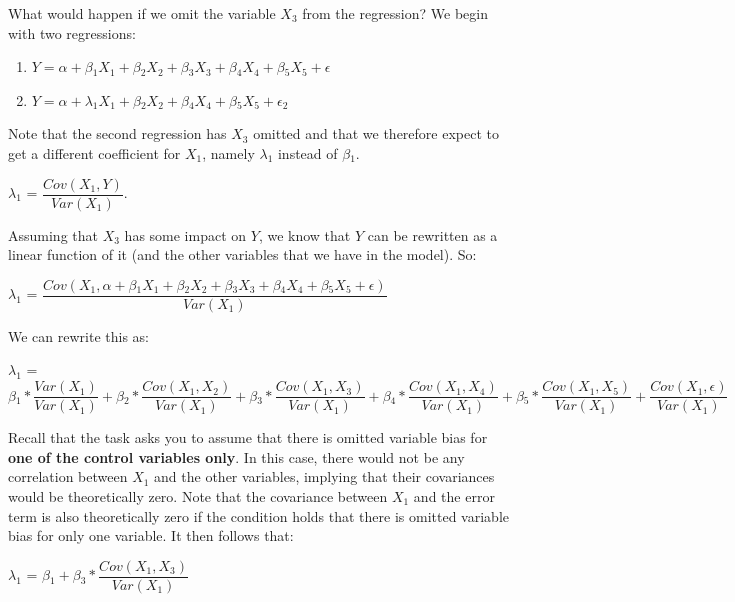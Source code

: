 \documentclass[12pt]{article}\usepackage[]{graphicx}\usepackage[]{color}
\begin{document}
What would happen if we omit the variable $X_3$ from the regression? We begin with two regressions:

\begin{enumerate}
  \item $ Y = \alpha + \beta{_1}X_1 + \beta{_2}X_2 + \beta{_3}X_3 + \beta{_4}X_4 + \beta{_5}X_5 + \epsilon$
  \item $ Y = \alpha + \lambda{_1}X_1 + \beta{_2}X_2 + \beta{_4}X_4 + \beta{_5}X_5 + \epsilon{_2}$
\end{enumerate}

\bigskip

Note that the second regression has $X_3$ omitted and that we therefore expect to get a different coefficient for $X_1$, namely  $\lambda{_1}$ instead of $\beta{_1}$.

\bigskip

$\lambda{_1}$ = $\dfrac{Cov(X_1,Y)}{Var(X_1)}$.

\bigskip

Assuming that $X_3$ has some impact on $Y$, we know that $Y$ can be rewritten as a linear function of it (and the other variables that we have in the model). So:

\bigskip

$\lambda{_1}$ = $\dfrac{Cov(X_1,\alpha + \beta{_1}X_1 + \beta{_2}X_2 + \beta{_3}X_3 + \beta{_4}X_4 + \beta{_5}X_5 + \epsilon)}{Var(X_1)}$

\bigskip

We can rewrite this as:

\bigskip

$\lambda{_1}$ = $\beta{_1}*\dfrac{Var(X_1)}{Var(X_1)} + \beta{_2}*\dfrac{Cov(X_1,X_2)}{Var(X_1)} + \beta{_3}*\dfrac{Cov(X_1,X_3)}{Var(X_1)} + \beta{_4}*\dfrac{Cov(X_1,X_4)}{Var(X_1)}  + \beta{_5}*\dfrac{Cov(X_1,X_5)}{Var(X_1)} + \dfrac{Cov(X_1,\epsilon)}{Var(X_1)}$

\bigskip

Recall that the task asks you to assume that there is omitted variable bias for \textbf{one of the control variables only}. In this case, there would not be any correlation between $X_1$ and the other variables, implying that their covariances would be theoretically zero. Note that the covariance between $X_1$ and the error term is also theoretically zero if the condition holds that there is omitted variable bias for only one variable. It then follows that:

\bigskip

$\lambda{_1}$ = $\beta{_1} + \beta{_3}*\dfrac{Cov(X_1,X_3)}{Var(X_1)}$
\end{document}
